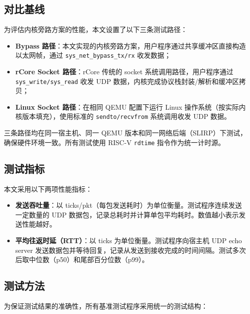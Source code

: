 \subsection{对比基线}

为评估内核旁路方案的性能，本文设置了以下三条测试路径：

\begin{itemize}
    \item \textbf{Bypass 路径}：本文实现的内核旁路方案，用户程序通过共享缓冲区直接构造以太网帧，通过 \texttt{sys\_net\_bypass\_tx/rx} 收发数据；
    \item \textbf{rCore Socket 路径}：rCore 传统的 socket 系统调用路径，用户程序通过 \texttt{sys\_write/sys\_read} 收发 UDP 数据，内核完成协议栈封装/解析和缓冲区拷贝；
    \item \textbf{Linux Socket 路径}：在相同 QEMU 配置下运行 Linux 操作系统（按实际内核版本填充），使用标准的 \texttt{sendto/recvfrom} 系统调用收发 UDP 数据。
\end{itemize}

三条路径均在同一宿主机、同一 QEMU 版本和同一网络后端（SLIRP）下测试，确保硬件环境一致。所有测试使用 RISC-V \texttt{rdtime} 指令作为统一计时源。

\subsection{测试指标}

本文采用以下两项性能指标：

\begin{itemize}
    \item \textbf{发送吞吐量}：以 ticks/pkt（每包发送耗时）为单位衡量。测试程序连续发送一定数量的 UDP 数据包，记录总耗时并计算单包平均耗时。数值越小表示发送性能越好。
    \item \textbf{平均往返时延（RTT）}：以 ticks 为单位衡量。测试程序向宿主机 UDP echo server 发送数据包并等待回复，记录从发送到接收完成的时间间隔。测试多次后取中位数（p50）和尾部百分位数（p99）。
\end{itemize}

\subsection{测试方法}

为保证测试结果的准确性，所有基准测试程序采用统一的测试结构：

